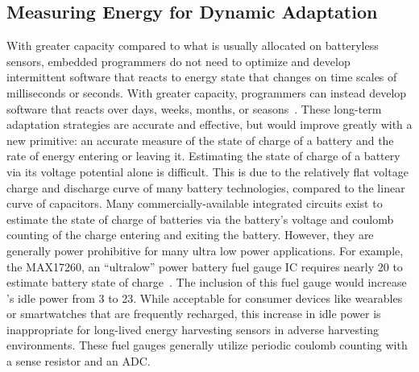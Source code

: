 \subsection{Measuring Energy for Dynamic Adaptation}
With greater capacity compared to what is usually allocated on batteryless sensors, embedded programmers do not need to optimize and develop intermittent software that reacts to energy state that changes on time scales of milliseconds or seconds. With greater capacity, programmers can instead develop software that reacts over days, weeks, months, or seasons~\cite{ahmed2019optimal}.
These long-term adaptation strategies are accurate and effective, but would improve greatly with a new primitive: an accurate measure of the state of charge of a battery and the rate of energy entering or leaving it.
Estimating the state of charge of a battery via its voltage potential alone is difficult.
This is due to the relatively flat voltage charge and discharge curve of many battery technologies, compared to the linear curve of capacitors.
Many commercially-available integrated circuits exist to estimate the state of charge of batteries via the battery's voltage and coulomb counting of the charge entering and exiting the battery.
However, they are generally power prohibitive for many ultra low power applications.
For example, the MAX17260, an ``ultralow'' power battery fuel gauge IC requires nearly 20\ssi{\micro\watt} to estimate battery state of charge~\cite{max17260}.
The inclusion of this fuel gauge would increase \name{}'s idle power from 3\ssi{\micro\watt} to 23\ssi{\micro\watt}.
While acceptable for consumer devices like wearables or smartwatches that are frequently recharged, this increase in idle power is inappropriate for long-lived energy harvesting sensors in adverse harvesting environments.
These fuel gauges generally utilize periodic coulomb counting with a sense resistor and an ADC.


